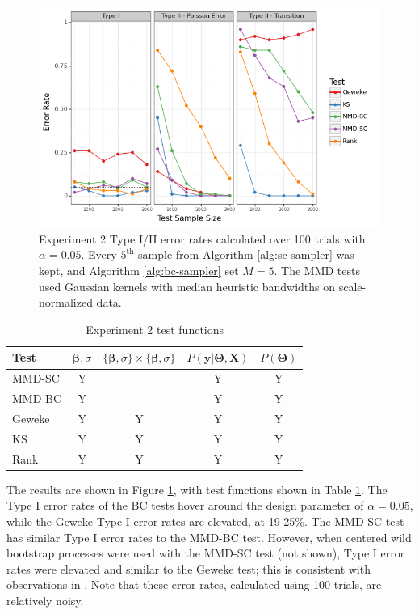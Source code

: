 \documentclass[a4paper,11pt]{article}
\begin{document}
\begin{figure}
    \centering
    \includegraphics[width=\textwidth]{figures/bayes_lasso_comparison.png}
    \caption{Experiment 2 Type I/II error rates calculated over 100 trials with $\alpha=0.05$. Every $5^{\text{th}}$ sample from Algorithm \ref{alg:sc-sampler} was kept, and Algorithm \ref{alg:bc-sampler} set $M=5$. The MMD tests used Gaussian kernels with median heuristic bandwidths on scale-normalized data.}
    \label{fig:ex2_comparison}
\end{figure}

\begin{table}[H]
    \centering
    \begin{tabular}{l|c|c|c|c}
         Test  & $\mathbf{\beta}, \sigma$ & $\{\mathbf{\beta}, \sigma\} \times \{\mathbf{\beta}, \sigma\}$ & $P(\mathbf{y}|\mathbf{\Theta}, \mathbf{X})$ & $P(\mathbf{\Theta})$ \\
         \hline
         MMD-SC & Y & & Y & Y \\
         MMD-BC & Y & & Y & Y \\
         Geweke & Y & Y & Y & Y \\
         KS & Y & Y & Y & Y \\
         Rank & Y & Y & Y & Y\\
    \end{tabular}
    \caption{Experiment 2 test functions}
    \label{tab:ex2_testfn}
\end{table}

The results are shown in Figure \ref{fig:ex2_comparison}, with test functions shown in Table \ref{tab:ex2_testfn}. The Type I error rates of the BC tests hover around the design parameter of $\alpha=0.05$, while the Geweke Type I error rates are elevated, at 19-25\%. The MMD-SC test has similar Type I error rates to the MMD-BC test. However, when centered wild bootstrap processes were used with the MMD-SC test (not shown), Type I error rates were elevated and similar to the Geweke test; this is consistent with observations in \cite{sutherland_generative_2019}. Note that these error rates, calculated using 100 trials, are relatively noisy.
\end{document}
